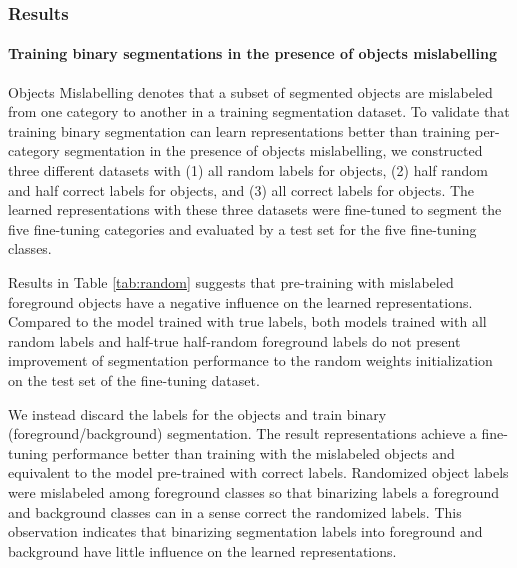 

\subsubsection{Results}



\paragraph{Training binary segmentations in the presence of objects mislabelling}
Objects Mislabelling denotes that a subset of segmented objects are mislabeled from one category to another in a training segmentation dataset.
To validate that training binary segmentation can learn representations better than training per-category segmentation in the presence of objects mislabelling, we constructed three different datasets with (1) all random labels for objects, (2) half random and half correct labels for objects, and (3) all correct labels for objects.
The learned representations with these three datasets were fine-tuned to segment the five fine-tuning categories and evaluated by a test set for the five fine-tuning classes.

Results in Table \ref{tab:random} suggests that pre-training with mislabeled foreground objects have a negative influence on the learned representations.
Compared to the model trained with true labels, both models trained with all random labels and half-true half-random foreground labels do not present improvement of segmentation performance to the random weights initialization on the test set of the fine-tuning dataset.

We instead discard the labels for the objects and train binary (foreground/background) segmentation.
The result representations achieve a fine-tuning performance better than training with the mislabeled objects and equivalent to the model pre-trained with correct labels.
Randomized object labels were mislabeled among foreground classes so that binarizing labels a foreground and background classes can in a sense correct the randomized labels.
This observation indicates that binarizing segmentation labels into foreground and background have little influence on the learned representations.

